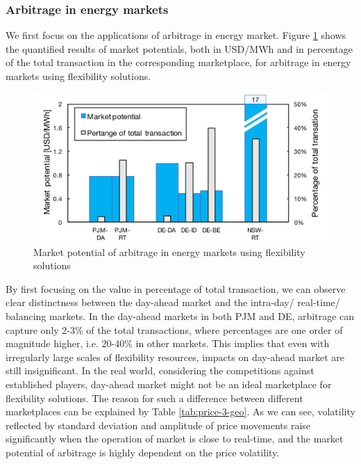\subsubsection{Arbitrage in energy markets}

We first focus on the applications of arbitrage in energy market. Figure \ref{fig:Potential-Arbitrage} shows the quantified results of market potentials, both in USD/MWh and in percentage of the total transaction in the corresponding marketplace, for arbitrage in energy markets using flexibility solutions. 
	
\begin{figure}[h!]
	\centering
	\includegraphics[width=0.95\linewidth]{Figures/Potential-Arbitrage}
	\caption{Market potential of arbitrage in energy markets using flexibility solutions}
	\label{fig:Potential-Arbitrage}
\end{figure}

By first focusing on the value in percentage of total transaction, we can observe clear distinctness between the day-ahead market  and the intra-day/ real-time/ balancing markets. In the day-ahead markets in both PJM and DE, arbitrage can capture only 2-3\% of the total transactions, where percentages are one order of magnitude higher, i.e. 20-40\% in other markets. This implies that even with irregularly large scales of flexibility resources, impacts on day-ahead market are still insignificant. In the real world, considering the competitions against established players, day-ahead market might not be an ideal marketplace for flexibility solutions. The reason for such a difference between different marketplaces can be explained by Table \ref{tab:price-3-geo}. As we can see, volatility reflected by standard deviation and amplitude of price movements raise significantly when the operation of market is close to real-time, and the market potential of arbitrage is highly dependent on the price volatility.

